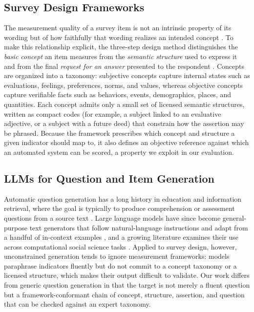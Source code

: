 \documentclass[onecolumn, 11pt]{IEEEtran}
\begin{document}
\subsection{Survey Design Frameworks}
The measurement quality of a survey item is not an intrinsic property of its wording but of how faithfully that wording realizes an intended concept \cite{groves2009survey}. To make this relationship explicit, the three-step design method distinguishes the \emph{basic concept} an item measures from the \emph{semantic structure} used to express it and from the final \emph{request for an answer} presented to the respondent \cite{saris2014design}. Concepts are organized into a taxonomy: subjective concepts capture internal states such as evaluations, feelings, preferences, norms, and values, whereas objective concepts capture verifiable facts such as behaviors, events, demographics, places, and quantities. Each concept admits only a small set of licensed semantic structures, written as compact codes (for example, a subject linked to an evaluative adjective, or a subject with a future deed) that constrain how the assertion may be phrased. Because the framework prescribes which concept and structure a given indicator should map to, it also defines an objective reference against which an automated system can be scored, a property we exploit in our evaluation.

\subsection{LLMs for Question and Item Generation}
Automatic question generation has a long history in education and information retrieval, where the goal is typically to produce comprehension or assessment questions from a source text \cite{kurdi2020systematic}. Large language models have since become general-purpose text generators that follow natural-language instructions and adapt from a handful of in-context examples \cite{brown2020language, liu2023prompt}, and a growing literature examines their use across computational social science tasks \cite{ziems2024can}. Applied to survey design, however, unconstrained generation tends to ignore measurement frameworks: models paraphrase indicators fluently but do not commit to a concept taxonomy or a licensed structure, which makes their output difficult to validate. Our work differs from generic question generation in that the target is not merely a fluent question but a framework-conformant chain of concept, structure, assertion, and question that can be checked against an expert taxonomy.
\end{document}
